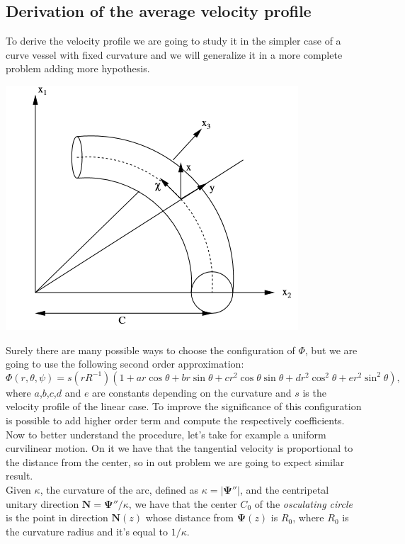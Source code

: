 \documentclass[a4paper]{report}
\begin{document}
\subsection{Derivation of the average velocity profile}
To derive the velocity profile we are going to study it in the simpler case of a curve vessel with fixed curvature and we will generalize it in a more complete problem adding more hypothesis.
		\begin{center}
			\includegraphics[scale=0.7]{tubo_curvo}
		\end{center}
Surely there are many possible ways to choose the configuration of $\Phi$, but we are going to use the following second order approximation:
\begin{equation}
\Phi (r,\theta, \psi) = s(r R^{-1}) (1+ a r \cos \theta+ b r \sin \theta + c r^2 \cos \theta \sin \theta + d r^2 \cos^2 \theta + e r^2 \sin^2 \theta),
\end{equation}
where $a$,$b$,$c$,$d$ and $e$ are constants depending on the curvature and $s$ is the velocity profile of the linear case. To improve the significance of this configuration is possible to add higher order term and compute the respectively coefficients.\\
Now to better understand the procedure, let's take for example a uniform curvilinear motion. On it we have that the tangential velocity is proportional to the distance from the center, so in out problem we are going to expect similar result.\\
Given $\kappa$, the curvature of the arc, defined as $\kappa = |\boldsymbol{\Psi}''|$, and the centripetal unitary direction $\mathbf{N}=\boldsymbol{\Psi}''/\kappa$, we have that the center $C_0$ of the {\it osculating circle} is the point in direction $\mathbf{N}(z)$ whose distance from $\boldsymbol{\Psi} (z)$ is $R_0$, where $R_0$ is the curvature radius and it's equal to $1/\kappa$.
\end{document}
